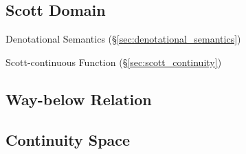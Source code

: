 \subsection{Scott Domain}\label{sec:scott_domain}

Denotational Semantics (\S\ref{sec:denotational_semantics})

Scott-continuous Function (\S\ref{sec:scott_continuity})



\subsection{Way-below Relation}\label{sec:waybelow_relation}

\subsection{Continuity Space}\label{sec:continuity_space}
